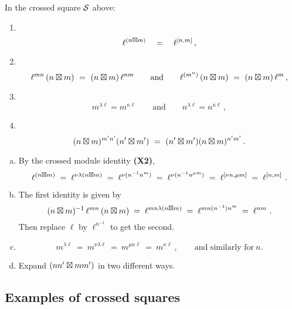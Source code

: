 \begin{lem} \label{lem:xsq}
In the crossed square  $\mathcal{S}$  above:
\begin{enumerate}[{\em (a)}]
\item~
\vspace*{-5mm} 
$$
\ell^{(n \boxtimes m)} \quad = \quad \ell^{[n,m]}\,,
$$
\item~
\vspace*{-5mm} 
$$
\ell^{mn}\,(n \boxtimes m) ~=~ (n \boxtimes m)\,\ell^{nm}
\qquad\mbox{and}\qquad
\ell^{(m^n)}\,(n \boxtimes m) ~=~ (n \boxtimes m)\,\ell^{m}\,, 
$$
\item~
\vspace*{-5mm} 
$$
m^{\lambda\ell} = m^{\kappa\ell}
\qquad\mbox{and}\qquad 
n^{\lambda\ell} = n^{\kappa\ell}\,,
$$
\item~
\vspace*{-5mm} 
$$
(n \boxtimes m)^{m'n'} (n' \boxtimes m') ~=~ (n' \boxtimes m')(n \boxtimes m)^{n'm'}\,. 
$$
\end{enumerate}
\end{lem}
\begin{pf}
\begin{enumerate}[(a)]
\item 
By the crossed module identity {\bf (X2)}, 
$$
\ell^{(n \boxtimes m)}
  \;=\;  \ell^{\nu\lambda(n \boxtimes m)}
  \;=\;  \ell^{\nu(n^{-1}n^m)}
  \;=\;  \ell^{\nu(n^{-1}n^{\mu m})}
  \;=\;  \ell^{[\nu n, \mu m]}
  \;=\;  \ell^{[n,m]}~.
$$
\item
The first identity is given by
$$
(n \boxtimes m)^{-1}\,\ell^{mn}\,(n \boxtimes m) \;=\;
\ell^{mn\lambda(n \boxtimes m)} \;=\;
\ell^{mn({n^{-1}})n^m} \;=\;
\ell^{nm}~.
$$
Then replace $\ell$ by $\ell^{n^{-1}}$ to get the second.
\item
$$
m^{\lambda\ell} ~=~ m^{\nu\lambda\ell} ~=~ m^{\mu\kappa\ell} 
~=~  m^{\kappa\ell}~, \qquad\mbox{and similarly for}~ n. 
$$ 
\item
Expand $(nn' \boxtimes mm')$ in two different ways. 
\end{enumerate}
\end{pf}


\subsection{Examples of crossed squares}

